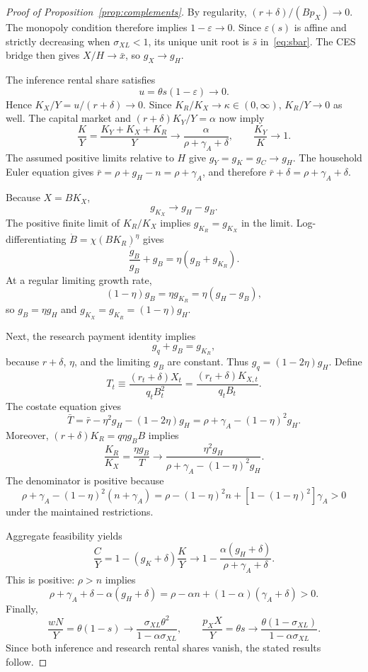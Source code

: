 \begin{proof}[Proof of Proposition~\ref{prop:complements}]
By regularity, $(r+\delta)/(Bp_X)\to0$. The monopoly condition therefore implies $1-\varepsilon\to0$. Since $\varepsilon(s)$ is affine and strictly decreasing when $\sigma_{XL}<1$, its unique unit root is $\bar s$ in~\eqref{eq:sbar}. The CES bridge then gives $X/H\to\bar x$, so $g_X\to g_H$.

The inference rental share satisfies
\[
 u=\theta s(1-\varepsilon)\longrightarrow0.
\]
Hence $K_X/Y=u/(r+\delta)\to0$. Since $K_R/K_X\to\kappa\in(0,\infty)$, $K_R/Y\to0$ as well. The capital market and
$(r+\delta)K_Y/Y=\alpha$ now imply
\[
 \frac{K}{Y}
 =\frac{K_Y+K_X+K_R}{Y}
 \longrightarrow\frac{\alpha}{\rho+\gamma_A+\delta},
 \qquad \frac{K_Y}{K}\to1.
\]
The assumed positive limits relative to $H$ give
$g_Y=g_K=g_C\to g_H$. The household Euler equation gives
$\bar r=\rho+g_H-n=\rho+\gamma_A$, and therefore
$\bar r+\delta=\rho+\gamma_A+\delta$.

Because $X=BK_X$,
\[
 g_{K_X}\longrightarrow g_H-g_B.
\]
The positive finite limit of $K_R/K_X$ implies
$g_{K_R}=g_{K_X}$ in the limit. Log-differentiating
$\dot B=\chi(BK_R)^\eta$ gives
\[
 \frac{\dot g_B}{g_B}+g_B
 =\eta(g_B+g_{K_R}).
\]
At a regular limiting growth rate,
\[
 (1-\eta)g_B=\eta g_{K_R}
 =\eta(g_H-g_B),
\]
so $g_B=\eta g_H$ and
$g_{K_X}=g_{K_R}=(1-\eta)g_H$.

Next, the research payment identity implies
\[
 g_q+g_B=g_{K_R},
\]
because $r+\delta$, $\eta$, and the limiting $g_B$ are constant. Thus
$g_q=(1-2\eta)g_H$. Define
\[
 T_t\equiv\frac{(r_t+\delta)X_t}{q_tB_t^2}
 =\frac{(r_t+\delta)K_{X,t}}{q_tB_t}.
\]
The costate equation gives
\[
 \bar T
 =\bar r-\eta^2g_H-(1-2\eta)g_H
 =\rho+\gamma_A-(1-\eta)^2g_H.
\]
Moreover, $(r+\delta)K_R=q\eta g_BB$ implies
\[
 \frac{K_R}{K_X}
 =\frac{\eta g_B}{T}
 \longrightarrow
 \frac{\eta^2g_H}
 {\rho+\gamma_A-(1-\eta)^2g_H}.
\]
The denominator is positive because
\[
 \rho+\gamma_A-(1-\eta)^2(n+\gamma_A)
 =\rho-(1-\eta)^2n+
 [1-(1-\eta)^2]\gamma_A>0
\]
under the maintained restrictions.

Aggregate feasibility yields
\[
 \frac{C}{Y}
 =1-(g_K+\delta)\frac{K}{Y}
 \longrightarrow
 1-\frac{\alpha(g_H+\delta)}
 {\rho+\gamma_A+\delta}.
\]
This is positive: $\rho>n$ implies
\[
 \rho+\gamma_A+\delta-\alpha(g_H+\delta)
 =\rho-\alpha n+(1-\alpha)(\gamma_A+\delta)>0.
\]
Finally,
\[
 \frac{wN}{Y}=\theta(1-s)
 \longrightarrow
 \frac{\sigma_{XL}\theta^2}
 {1-\alpha\sigma_{XL}},
\qquad
 \frac{p_XX}{Y}=\theta s
 \longrightarrow
 \frac{\theta(1-\sigma_{XL})}
 {1-\alpha\sigma_{XL}}.
\]
Since both inference and research rental shares vanish, the stated results follow.
\end{proof}

